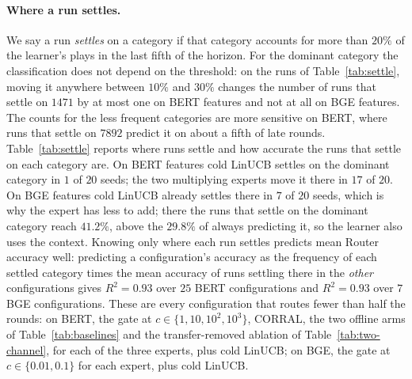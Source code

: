 \documentclass{article}
\theoremstyle{definition}
\theoremstyle{remark}
\theoremstyle{remark}
\begin{document}
\paragraph{Where a run settles.}
We say a run \emph{settles} on a category if that category accounts for more
than $20\%$ of the learner's plays in the last fifth of the horizon. For the
dominant category the classification does not depend on the threshold: on the
runs of Table~\ref{tab:settle}, moving it anywhere between $10\%$ and $30\%$
changes the number of runs that settle on $1471$ by at most one on BERT
features and not at all on BGE features. The counts for the less frequent
categories are more sensitive on BERT, where runs that settle on $7892$
predict it on about a fifth of late rounds. Table~\ref{tab:settle}
reports where runs settle and how accurate the runs that settle on each
category are. On BERT features cold LinUCB settles on the dominant category
in $1$ of $20$ seeds; the two multiplying experts move it there in $17$ of
$20$. On BGE features cold LinUCB already settles there in $7$ of $20$ seeds,
which is why the expert has less to add; there the runs that settle on the
dominant category reach $41.2\%$, above the $29.8\%$ of always predicting
it, so the learner also uses the context. Knowing only where each run
settles predicts mean Router accuracy well: predicting a configuration's
accuracy as the frequency of each settled category times the mean accuracy
of runs settling there in the \emph{other} configurations gives $R^2=0.93$
over $25$ BERT configurations and $R^2=0.93$ over $7$ BGE configurations.
These are every configuration that routes fewer than half the rounds: on
BERT, the gate at $c\in\{1,10,10^2,10^3\}$, CORRAL, the two offline arms of
Table~\ref{tab:baselines} and the transfer-removed ablation of
Table~\ref{tab:two-channel}, for each of the three experts, plus cold
LinUCB; on BGE, the gate at $c\in\{0.01,0.1\}$ for each expert, plus cold
LinUCB.
\end{document}
